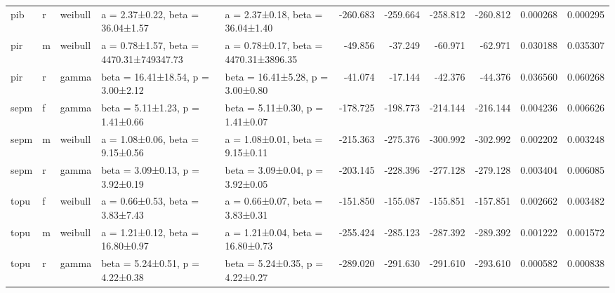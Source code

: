 \begin{tabular}{lllllrrrrrr}
pib & r & weibull & a = 2.37±0.22, beta = 36.04±1.57 & a = 2.37±0.18, beta = 36.04±1.40 & -260.683 & -259.664 & -258.812 & -260.812 & 0.000268 & 0.000295 \\
pir & m & weibull & a = 0.78±1.57, beta = 4470.31±749347.73 & a = 0.78±0.17, beta = 4470.31±3896.35 & -49.856 & -37.249 & -60.971 & -62.971 & 0.030188 & 0.035307 \\
pir & r & gamma & beta = 16.41±18.54, p = 3.00±2.12 & beta = 16.41±5.28, p = 3.00±0.80 & -41.074 & -17.144 & -42.376 & -44.376 & 0.036560 & 0.060268 \\
sepm & f & gamma & beta = 5.11±1.23, p = 1.41±0.66 & beta = 5.11±0.30, p = 1.41±0.07 & -178.725 & -198.773 & -214.144 & -216.144 & 0.004236 & 0.006626 \\
sepm & m & weibull & a = 1.08±0.06, beta = 9.15±0.56 & a = 1.08±0.01, beta = 9.15±0.11 & -215.363 & -275.376 & -300.992 & -302.992 & 0.002202 & 0.003248 \\
sepm & r & gamma & beta = 3.09±0.13, p = 3.92±0.19 & beta = 3.09±0.04, p = 3.92±0.05 & -203.145 & -228.396 & -277.128 & -279.128 & 0.003404 & 0.006085 \\
topu & f & weibull & a = 0.66±0.53, beta = 3.83±7.43 & a = 0.66±0.07, beta = 3.83±0.31 & -151.850 & -155.087 & -155.851 & -157.851 & 0.002662 & 0.003482 \\
topu & m & weibull & a = 1.21±0.12, beta = 16.80±0.97 & a = 1.21±0.04, beta = 16.80±0.73 & -255.424 & -285.123 & -287.392 & -289.392 & 0.001222 & 0.001572 \\
topu & r & gamma & beta = 5.24±0.51, p = 4.22±0.38 & beta = 5.24±0.35, p = 4.22±0.27 & -289.020 & -291.630 & -291.610 & -293.610 & 0.000582 & 0.000838 \\
\bottomrule
\end{tabular}
